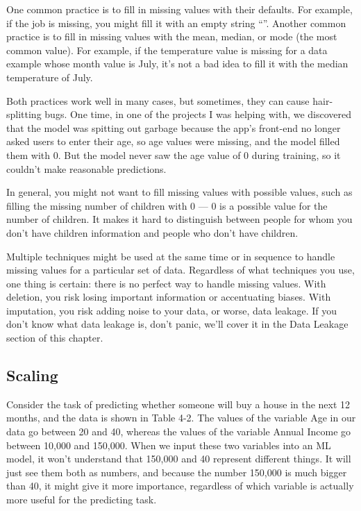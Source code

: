 \documentclass[openany]{book}
\begin{document}
One common practice is to fill in missing values with their defaults. For example, if the job is missing, you might fill it with an empty string “”. Another common practice is to fill in missing values with the mean, median, or mode (the most common value). For example, if the temperature value is missing for a data example whose month value is July, it’s not a bad idea to fill it with the median temperature of July.

Both practices work well in many cases, but sometimes, they can cause hair-splitting bugs. One time, in one of the projects I was helping with, we discovered that the model was spitting out garbage because the app’s front-end no longer asked users to enter their age, so age values were missing, and the model filled them with 0. But the model never saw the age value of 0 during training, so it couldn’t make reasonable predictions.

In general, you might not want to fill missing values with possible values, such as filling the missing number of children with 0 — 0 is a possible value for the number of children. It makes it hard to distinguish between people for whom you don’t have children information and people who don’t have children.

Multiple techniques might be used at the same time or in sequence to handle missing values for a particular set of data. Regardless of what techniques you use, one thing is certain: there is no perfect way to handle missing values. With deletion, you risk losing important information or accentuating biases. With imputation, you risk adding noise to your data, or worse, data leakage. If you don’t know what data leakage is, don’t panic, we’ll cover it in the Data Leakage section of this chapter.


\subsection{Scaling}

Consider the task of predicting whether someone will buy a house in the next 12 months, and the data is shown in Table 4-2. The values of the variable Age in our data go between 20 and 40, whereas the values of the variable Annual Income go between 10,000 and 150,000. When we input these two variables into an ML model, it won’t understand that 150,000 and 40 represent different things. It will just see them both as numbers, and because the number 150,000 is much bigger than 40, it might give it more importance, regardless of which variable is actually more useful for the predicting task.
\end{document}

